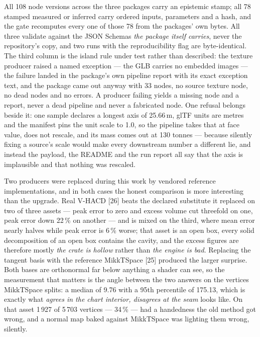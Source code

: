 \documentclass[10pt,twocolumn,letterpaper]{article}
\begin{document}
All 108 node versions across the three packages carry an epistemic stamp; all 78 stamped measured or inferred carry ordered inputs, parameters and a hash, and the gate recomputes every one of those 78 from the packages' own bytes. All three validate against the JSON Schemas \emph{the package itself carries}, never the repository's copy, and two runs with the reproducibility flag are byte-identical. The third column is the island rule under test rather than described: the texture producer raised a named exception --- the GLB carries no embedded images --- the failure landed in the package's own pipeline report with its exact exception text, and the package came out anyway with 33 nodes, no source texture node, no dead nodes and no errors. A producer failing yields a missing node and a report, never a dead pipeline and never a fabricated node. One refusal belongs beside it: one sample declares a longest axis of 25.66\,m, glTF units are metres and the manifest pins the unit scale to 1.0, so the pipeline takes that at face value, does not rescale, and its mass comes out at 130 tonnes --- because silently fixing a source's scale would make every downstream number a different lie, and instead the payload, the README and the run report all say that the axis is implausible and that nothing was rescaled.

Two producers were replaced during this work by vendored reference implementations, and in both cases the honest comparison is more interesting than the upgrade. Real V-HACD [26] beats the declared substitute it replaced on two of three assets --- peak error to zero and excess volume cut threefold on one, peak error down 22\,\% on another --- and is mixed on the third, where mean error nearly halves while peak error is 6\,\% worse; that asset is an open box, every solid decomposition of an open box contains the cavity, and the excess figures are therefore mostly \emph{the crate is hollow} rather than \emph{the engine is bad}. Replacing the tangent basis with the reference MikkTSpace [25] produced the larger surprise. Both bases are orthonormal far below anything a shader can see, so the measurement that matters is the angle between the two answers on the vertices MikkTSpace splits: a median of 9.76\textdegree{} with a 95th percentile of 175.13\textdegree{}, which is exactly what \emph{agrees in the chart interior, disagrees at the seam} looks like. On that asset 1\,927 of 5\,703 vertices --- 34\,\% --- had a handedness the old method got wrong, and a normal map baked against MikkTSpace was lighting them wrong, silently.
\end{document}
